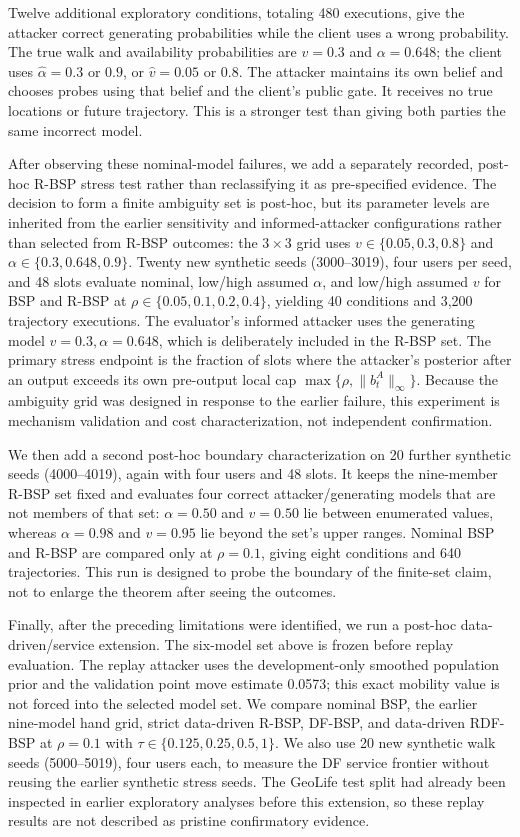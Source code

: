 \documentclass[review,12pt]{elsarticle}
\begin{document}
Twelve additional exploratory conditions, totaling 480 executions, give the attacker correct generating probabilities while the client uses a wrong probability. The true walk and availability probabilities are $v=0.3$ and $\alpha=0.648$; the client uses $\widehat\alpha=0.3$ or $0.9$, or $\widehat v=0.05$ or $0.8$. The attacker maintains its own belief and chooses probes using that belief and the client's public gate. It receives no true locations or future trajectory. This is a stronger test than giving both parties the same incorrect model.

After observing these nominal-model failures, we add a separately recorded, post-hoc R-BSP stress test rather than reclassifying it as pre-specified evidence. The decision to form a finite ambiguity set is post-hoc, but its parameter levels are inherited from the earlier sensitivity and informed-attacker configurations rather than selected from R-BSP outcomes: the $3\times3$ grid uses $v\in\{0.05,0.3,0.8\}$ and $\alpha\in\{0.3,0.648,0.9\}$. Twenty new synthetic seeds (3000--3019), four users per seed, and 48 slots evaluate nominal, low/high assumed $\alpha$, and low/high assumed $v$ for BSP and R-BSP at $\rho\in\{0.05,0.1,0.2,0.4\}$, yielding 40 conditions and 3,200 trajectory executions. The evaluator's informed attacker uses the generating model $v=0.3,\alpha=0.648$, which is deliberately included in the R-BSP set. The primary stress endpoint is the fraction of slots where the attacker's posterior after an output exceeds its own pre-output local cap $\max\{\rho,\|b_t^{A}\|_\infty\}$. Because the ambiguity grid was designed in response to the earlier failure, this experiment is mechanism validation and cost characterization, not independent confirmation.

We then add a second post-hoc boundary characterization on 20 further synthetic seeds (4000--4019), again with four users and 48 slots. It keeps the nine-member R-BSP set fixed and evaluates four correct attacker/generating models that are not members of that set: $\alpha=0.50$ and $v=0.50$ lie between enumerated values, whereas $\alpha=0.98$ and $v=0.95$ lie beyond the set's upper ranges. Nominal BSP and R-BSP are compared only at $\rho=0.1$, giving eight conditions and 640 trajectories. This run is designed to probe the boundary of the finite-set claim, not to enlarge the theorem after seeing the outcomes.

Finally, after the preceding limitations were identified, we run a post-hoc data-driven/service extension. The six-model set above is frozen before replay evaluation. The replay attacker uses the development-only smoothed population prior and the validation point move estimate 0.0573; this exact mobility value is not forced into the selected model set. We compare nominal BSP, the earlier nine-model hand grid, strict data-driven R-BSP, DF-BSP, and data-driven RDF-BSP at $\rho=0.1$ with $\tau\in\{0.125,0.25,0.5,1\}$. We also use 20 new synthetic walk seeds (5000--5019), four users each, to measure the DF service frontier without reusing the earlier synthetic stress seeds. The GeoLife test split had already been inspected in earlier exploratory analyses before this extension, so these replay results are not described as pristine confirmatory evidence.
\end{document}

